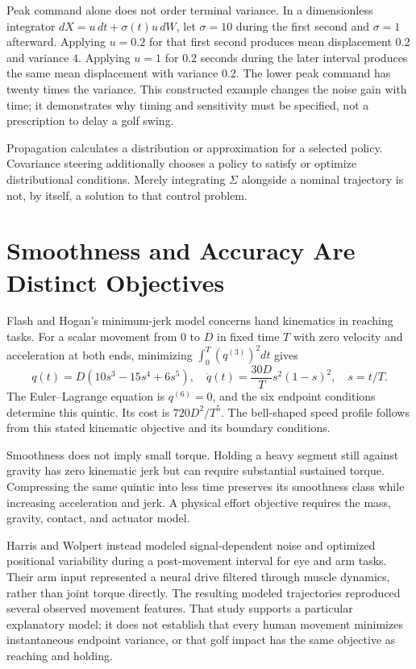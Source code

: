 \documentclass[12pt, openany]{book}
\theoremstyle{plain}
\begin{document}
Peak command alone does not order terminal variance. In a dimensionless integrator $dX=u\,dt+\sigma(t)u\,dW$, let $\sigma=10$ during the first second and $\sigma=1$ afterward. Applying $u=0.2$ for that first second produces mean displacement $0.2$ and variance $4$. Applying $u=1$ for $0.2$ seconds during the later interval produces the same mean displacement with variance $0.2$. The lower peak command has twenty times the variance. This constructed example changes the noise gain with time; it demonstrates why timing and sensitivity must be specified, not a prescription to delay a golf swing.

Propagation calculates a distribution or approximation for a selected policy. Covariance steering additionally chooses a policy to satisfy or optimize distributional conditions. Merely integrating $\Sigma$ alongside a nominal trajectory is not, by itself, a solution to that control problem.

\section{Smoothness and Accuracy Are Distinct Objectives}

Flash and Hogan's minimum-jerk model concerns hand kinematics in reaching tasks. For a scalar movement from $0$ to $D$ in fixed time $T$ with zero velocity and acceleration at both ends, minimizing $\int_0^T(q^{(3)})^2dt$ gives
\begin{equation}
q(t)=D(10s^3-15s^4+6s^5),\quad
\dot q(t)=\frac{30D}{T}s^2(1-s)^2,\quad s=t/T .
\end{equation}
The Euler--Lagrange equation is $q^{(6)}=0$, and the six endpoint conditions determine this quintic. Its cost is $720D^2/T^5$. The bell-shaped speed profile follows from this stated kinematic objective and its boundary conditions.

Smoothness does not imply small torque. Holding a heavy segment still against gravity has zero kinematic jerk but can require substantial sustained torque. Compressing the same quintic into less time preserves its smoothness class while increasing acceleration and jerk. A physical effort objective requires the mass, gravity, contact, and actuator model.

Harris and Wolpert instead modeled signal-dependent noise and optimized positional variability during a post-movement interval for eye and arm tasks. Their arm input represented a neural drive filtered through muscle dynamics, rather than joint torque directly. The resulting modeled trajectories reproduced several observed movement features. That study supports a particular explanatory model; it does not establish that every human movement minimizes instantaneous endpoint variance, or that golf impact has the same objective as reaching and holding.
\end{document}
